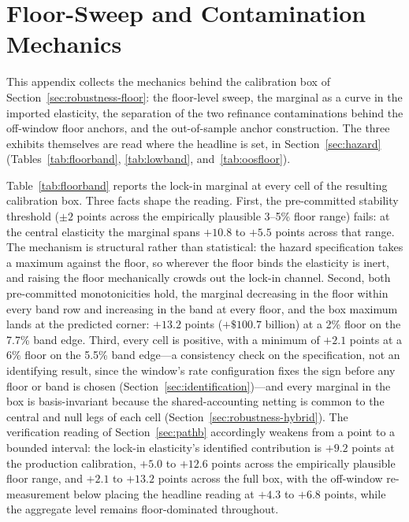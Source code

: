 \documentclass[12pt]{article}
\begin{document}
\nocite{cfpb_atr,frbny_soma,fred_actliscou,fred_wshomcb,fred_dspic96,fred_umcsent}

\section{Floor-Sweep and Contamination Mechanics}\label{app:floormech}

This appendix collects the mechanics behind the calibration box of Section~\ref{sec:robustness-floor}: the floor-level sweep, the marginal as a curve in the imported elasticity, the separation of the two refinance contaminations behind the off-window floor anchors, and the out-of-sample anchor construction. The three exhibits themselves are read where the headline is set, in Section~\ref{sec:hazard} (Tables~\ref{tab:floorband}, \ref{tab:lowband}, and~\ref{tab:oosfloor}).

Table~\ref{tab:floorband} reports the lock-in marginal at every cell of the resulting calibration box. Three facts shape the reading. First, the pre-committed stability threshold ($\pm 2$ points across the empirically plausible 3--5\% floor range) fails: at the central elasticity the marginal spans $+10.8$ to $+5.5$ points across that range. The mechanism is structural rather than statistical: the hazard specification takes a maximum against the floor, so wherever the floor binds the elasticity is inert, and raising the floor mechanically crowds out the lock-in channel. Second, both pre-committed monotonicities hold, the marginal decreasing in the floor within every band row and increasing in the band at every floor, and the box maximum lands at the predicted corner: $+13.2$ points ($+\$100.7$ billion) at a 2\% floor on the 7.7\% band edge. Third, every cell is positive, with a minimum of $+2.1$ points at a 6\% floor on the 5.5\% band edge---a consistency check on the specification, not an identifying result, since the window's rate configuration fixes the sign before any floor or band is chosen (Section~\ref{sec:identification})---and every marginal in the box is basis-invariant because the shared-accounting netting is common to the central and null legs of each cell (Section~\ref{sec:robustness-hybrid}). The verification reading of Section~\ref{sec:pathb} accordingly weakens from a point to a bounded interval: the lock-in elasticity's identified contribution is $+9.2$ points at the production calibration, $+5.0$ to $+12.6$ points across the empirically plausible floor range, and $+2.1$ to $+13.2$ points across the full box, with the off-window re-measurement below placing the headline reading at $+4.3$ to $+6.8$ points, while the aggregate level remains floor-dominated throughout.
\end{document}
